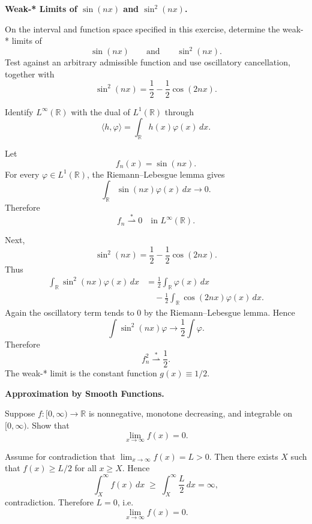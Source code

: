 \begin{problem}[CP-II-0102]
\label{prob:cp-ii-0102}
\textbf{Weak-* Limits of \(\sin(nx)\) and \(\sin^2(nx)\).}

\hspace*{1.5em}On the interval and function space specified in this exercise, determine the
weak-* limits of
\[
\sin(nx)
\qquad\text{and}\qquad
\sin^2(nx).
\]
Test against an arbitrary admissible function and use oscillatory cancellation,
together with
\[
\sin^2(nx)=\frac12-\frac12\cos(2nx).
\]
\end{problem}

\begin{solution}
Identify \(L^\infty(\mathbb R)\) with the dual of \(L^1(\mathbb R)\) through
\[
\langle h,\varphi\rangle
=
\int_{\mathbb R}h(x)\varphi(x)\,dx.
\]

Let
\[
f_n(x)=\sin(nx).
\]
For every \(\varphi\in L^1(\mathbb R)\), the Riemann--Lebesgue lemma gives
\[
\int_{\mathbb R}\sin(nx)\varphi(x)\,dx
\longrightarrow0.
\]
Therefore
\[
\boxed{
f_n\stackrel{*}{\rightharpoonup}0
\quad\text{in }L^\infty(\mathbb R).
}
\]

Next,
\[
\sin^2(nx)
=
\frac12-\frac12\cos(2nx).
\]
Thus
\[
\begin{aligned}
\int_{\mathbb R}\sin^2(nx)\varphi(x)\,dx
&=
\frac12\int_{\mathbb R}\varphi(x)\,dx\\
&\quad-
\frac12\int_{\mathbb R}\cos(2nx)\varphi(x)\,dx.
\end{aligned}
\]
Again the oscillatory term tends to \(0\) by the Riemann--Lebesgue lemma. Hence
\[
\int\sin^2(nx)\varphi
\longrightarrow
\frac12\int\varphi.
\]
Therefore
\[
\boxed{
f_n^2
\stackrel{*}{\rightharpoonup}
\frac12.
}
\]
The weak-* limit is the constant function \(g(x)\equiv1/2\).
\end{solution}


\begin{problem}[CP-II-0103]
\label{prob:cp-ii-0103}
\textbf{Approximation by Smooth Functions.}

\hspace*{1.5em}Suppose $f:[0,\infty)\to\mathbb{R}$ is nonnegative, monotone decreasing, and
integrable on $[0,\infty)$. Show that
\[
\lim_{x\to\infty} f(x)=0.
\]
\end{problem}

\begin{solution}
Assume for contradiction that $\lim_{x\to\infty} f(x)=L>0$. Then there exists
	$X$ such that $f(x)\geq L/2$ for all $x\geq X$. Hence
	\[
	\int_X^\infty f(x)\,dx \;\geq\;\int_X^\infty \frac{L}{2}\,dx = \infty,
	\]
	contradiction. Therefore $L=0$, i.e.
	\[
	\lim_{x\to\infty} f(x)=0.
	\]
\end{solution}

